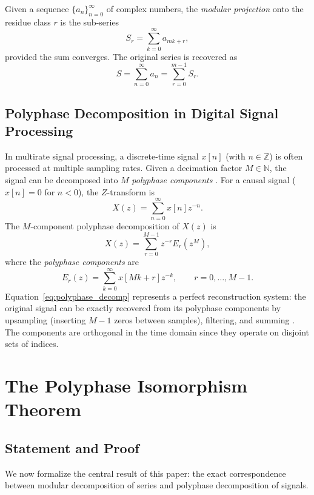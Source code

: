 \documentclass{article}
\theoremstyle{plain}
\theoremstyle{definition}
\theoremstyle{remark}
\begin{document}
Given a sequence \(\{a_n\}_{n=0}^{\infty}\) of complex numbers, the \emph{modular projection} onto the residue class \(r\) is the sub-series
\begin{equation}
S_r = \sum_{k=0}^{\infty} a_{mk + r},
\label{eq:Sr}
\end{equation}
provided the sum converges. The original series is recovered as
\begin{equation}
S = \sum_{n=0}^{\infty} a_n = \sum_{r=0}^{m-1} S_r.
\label{eq:recovery}
\end{equation}

\subsection{Polyphase Decomposition in Digital Signal Processing}
In multirate signal processing, a discrete-time signal \(x[n]\) (with \(n \in \mathbb{Z}\)) is often processed at multiple sampling rates. Given a decimation factor \(M \in \mathbb{N}\), the signal can be decomposed into \(M\) \emph{polyphase components} \cite{vaidyanathan}. For a causal signal (\(x[n] = 0\) for \(n < 0\)), the \(Z\)-transform is
\begin{equation}
X(z) = \sum_{n=0}^{\infty} x[n] z^{-n}.
\label{eq:ZT}
\end{equation}
The \(M\)-component polyphase decomposition of \(X(z)\) is
\begin{equation}
X(z) = \sum_{r=0}^{M-1} z^{-r} E_r(z^M),
\label{eq:polyphase_decomp}
\end{equation}
where the \emph{polyphase components} are
\begin{equation}
E_r(z) = \sum_{k=0}^{\infty} x[Mk + r] z^{-k}, \qquad r = 0, \dots, M-1.
\label{eq:Er}
\end{equation}
Equation~\eqref{eq:polyphase_decomp} represents a perfect reconstruction system: the original signal can be exactly recovered from its polyphase components by upsampling (inserting \(M-1\) zeros between samples), filtering, and summing \cite{vaidyanathan}. The components are orthogonal in the time domain since they operate on disjoint sets of indices.

\section{The Polyphase Isomorphism Theorem}
\label{sec:isomorphism}

\subsection{Statement and Proof}
We now formalize the central result of this paper: the exact correspondence between modular decomposition of series and polyphase decomposition of signals.
\end{document}
